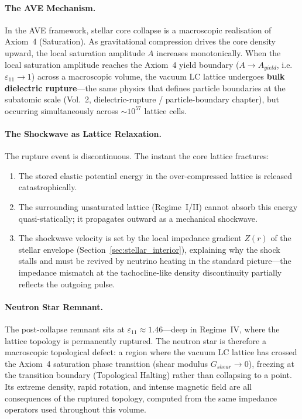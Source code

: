 \paragraph{The AVE Mechanism.}
In the AVE framework, stellar core collapse is a macroscopic realisation of Axiom~4 (Saturation). As gravitational compression drives the core density upward, the local saturation amplitude $A$ increases monotonically. When the local saturation amplitude reaches the Axiom~4 yield boundary ($A \to A_{yield}$, i.e.\ $\varepsilon_{11} \to 1$) across a macroscopic volume, the vacuum LC lattice undergoes \textbf{bulk dielectric rupture}---the same physics that defines particle boundaries at the subatomic scale (Vol.~2, dielectric-rupture / particle-boundary chapter), but occurring simultaneously across $\sim 10^{57}$ lattice cells.

\paragraph{The Shockwave as Lattice Relaxation.}
The rupture event is discontinuous. The instant the core lattice fractures:
\begin{enumerate}
    \item The stored elastic potential energy in the over-compressed lattice is released catastrophically.
    \item The surrounding unsaturated lattice (Regime~I/II) cannot absorb this energy quasi-statically; it propagates outward as a mechanical shockwave.
    \item The shockwave velocity is set by the local impedance gradient $Z(r)$ of the stellar envelope (Section~\ref{sec:stellar_interior}), explaining why the shock stalls and must be revived by neutrino heating in the standard picture---the impedance mismatch at the tachocline-like density discontinuity partially reflects the outgoing pulse.
\end{enumerate}

\paragraph{Neutron Star Remnant.}
The post-collapse remnant sits at $\varepsilon_{11} \approx 1.46$---deep in Regime~IV, where the lattice topology is permanently ruptured. The neutron star is therefore a macroscopic topological defect: a region where the vacuum LC lattice has crossed the Axiom~4 saturation phase transition (shear modulus $G_{shear} \to 0$), freezing at the transition boundary (Topological Halting) rather than collapsing to a point. Its extreme density, rapid rotation, and intense magnetic field are all consequences of the ruptured topology, computed from the same impedance operators used throughout this volume.

